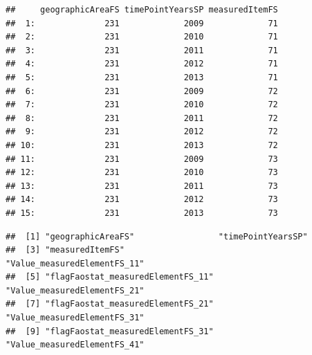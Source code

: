 \documentclass[nojss]{jss}
\begin{document}
\begin{knitrout}
\color{fgcolor}\begin{kframe}
\begin{alltt}
\hlopt{$}  \hlstd{=} \hlstd{,}  \hlstd{=} \hlstd{)}
\hlopt{$}\hlstd{nodes[,} \hlstd{(geographicAreaFS, timePointYearsSP, measuredItemFS)]}
\end{alltt}
\begin{verbatim}
##     geographicAreaFS timePointYearsSP measuredItemFS
##  1:              231             2009             71
##  2:              231             2010             71
##  3:              231             2011             71
##  4:              231             2012             71
##  5:              231             2013             71
##  6:              231             2009             72
##  7:              231             2010             72
##  8:              231             2011             72
##  9:              231             2012             72
## 10:              231             2013             72
## 11:              231             2009             73
## 12:              231             2010             73
## 13:              231             2011             73
## 14:              231             2012             73
## 15:              231             2013             73
\end{verbatim}
\begin{alltt}
\hlopt{$}\hlstd{nodes)[}\hlopt{:}\hlstd{]}
\end{alltt}
\begin{verbatim}
##  [1] "geographicAreaFS"                 "timePointYearsSP"                
##  [3] "measuredItemFS"                   "Value_measuredElementFS_11"      
##  [5] "flagFaostat_measuredElementFS_11" "Value_measuredElementFS_21"      
##  [7] "flagFaostat_measuredElementFS_21" "Value_measuredElementFS_31"      
##  [9] "flagFaostat_measuredElementFS_31" "Value_measuredElementFS_41"
\end{verbatim}
\begin{alltt}
\hlopt{$}\hlstd{edges[,} 
                       \hlstd{measuredItemParentFS, measuredItemChildFS)]}
\end{alltt}
\begin{verbatim}

\end{verbatim}
\end{kframe}
\end{knitrout}
\end{document}

